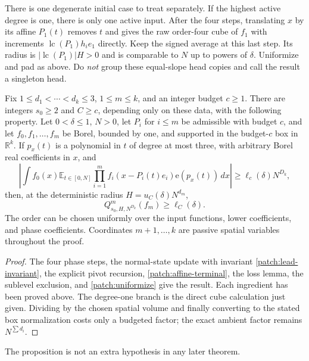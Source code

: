 \documentclass[11pt]{article}
\theoremstyle{definition}
\newcommand{\ee}[1]{\mathrm e\!\left(#1\right)}
\newcommand{\R}{\mathbb R}
\begin{document}
There is one degenerate initial case to treat separately.  If the highest active degree is
one, there is only one active input.  After the four steps, translating $x$ by its affine
$P_1(t)$ removes $t$ and gives the raw order-four cube of $f_1$ with increments
$\operatorname{lc}(P_1)h_i e_1$ directly.  Keep the signed average at this last step.
Its radius is $|\operatorname{lc}(P_1)|H>0$ and is comparable to $N$ up to powers of $\delta$.
Uniformize and pad as above.  Do \emph{not} group these equal-slope head copies and call the
result a singleton head.

\begin{proposition}
\label{patch:highest-control}
Fix $1\leq d_1<\cdots<d_k\leq3$, $1\leq m\leq k$, and an integer budget $c\geq1$.
There are integers $s_0\geq2$ and $C\geq c$, depending only on these data, with the following
property. Let $0<\delta\leq1$, $N>0$, let $P_i$ for $i\leq m$ be admissible with budget
$c$, and let $f_0,f_1,\ldots,f_m$ be Borel, bounded by one, and supported in the budget-$c$
box in $\R^k$. If $p_x(t)$ is a polynomial in $t$ of degree at most three, with arbitrary
Borel real coefficients in $x$, and
\[
 \left|\int f_0(x)\mathbb E_{t\in[0,N]}\prod_{i=1}^m
          f_i(x-P_i(t)e_i)\ee{p_x(t)}\,dx\right|\geq\ell_c(\delta)N^{D_k},
\]
then, at the deterministic radius $H=u_C(\delta)N^{d_m}$,
\[
 Q_{s_0,H,N^{D_k}}^m(f_m)\geq\ell_C(\delta).
\]
The order can be chosen uniformly over the input functions, lower coefficients, and phase
coefficients. Coordinates $m+1,\ldots,k$ are passive spatial variables throughout the proof.
\end{proposition}
\begin{proof}
The four phase steps, the normal-state update with invariant \eqref{patch:lead-invariant},
the explicit pivot recursion, \eqref{patch:affine-terminal}, the loss lemma, the sublevel
exclusion, and \cref{patch:uniformize} give the result.  Each ingredient has been proved above.
The degree-one branch is the direct cube calculation just given.  Dividing by the chosen
spatial volume and finally converting to the stated box normalization costs only a budgeted
factor; the exact ambient factor remains $N^{\sum d_i}$.
\end{proof}
The proposition is not an extra hypothesis in any later theorem.
\end{document}
